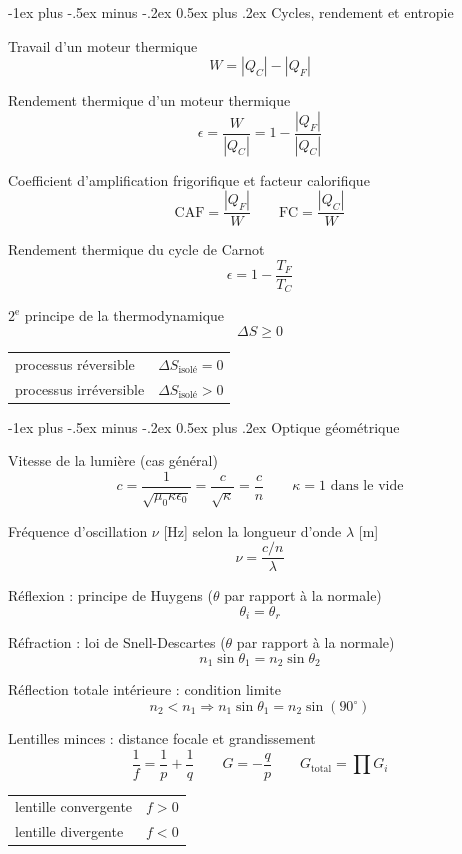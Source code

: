 \documentclass[10pt,landscape]{article}
\makeatletter
\renewcommand{\section}{\@startsection{section}{1}{0mm}%
                                {-1ex plus -.5ex minus -.2ex}%
                                {0.5ex plus .2ex}%
                                {\normalfont\large\bfseries}}
\newcommand{\halfline}{\vspace{0.5em}}
\newcommand{\tableindent}{\hspace{1.5em}}
\makeatother
\begin{document}
\begin{multicols}{3}
\hrulefill

\section{Cycles, rendement et entropie}

Travail d'un moteur thermique
\[ W = |Q_C| - |Q_F| \]

Rendement thermique d'un moteur thermique
\[ \epsilon=\frac{W}{|Q_C|} = 1 - \frac{|Q_F|}{|Q_C|} \]

Coefficient d'amplification frigorifique et facteur calorifique
\[ \text{CAF} = \frac{|Q_F|}{W} \qquad
\text{FC} = \frac{|Q_C|}{W} \]

Rendement thermique du cycle de Carnot
\[ \epsilon= 1- \frac{T_F}{T_C} \]

$2^\text{e}$ principe de la thermodynamique
\[ \Delta S \geq 0 \]

\begin{tabular}{@{\tableindent}ll}
	processus réversible & $\Delta S_\text{isolé} = 0$ \\
	processus irréversible & $\Delta S_\text{isolé} > 0$ \\
\end{tabular}
\halfline

\hrulefill


\section{Optique géométrique}

Vitesse de la lumière (cas général)
\[ c = \frac{1}{\sqrt{\mu_0 \kappa \epsilon_0}} = \frac{c}{\sqrt{\kappa}} = \frac{c}{n}  
\qquad
\kappa=1 \text{ dans le vide}
\]

Fréquence d'oscillation $\nu$ [Hz] selon la longueur d'onde $\lambda$ [m]
\[ \nu = \frac{c/n}{\lambda}\]

Réflexion : principe de Huygens {($\theta$ par rapport à la normale)}
\[ \theta_i = \theta_r\]

Réfraction : loi de Snell-Descartes {($\theta$ par rapport à la normale)}
\[ n_1\sin\theta_1 = n_2 \sin\theta_2
\]

Réflection totale intérieure : condition limite
\[ n_2 < n_1 \Rightarrow n_1 \sin\theta_1 = n_2 \sin(90^\circ)
\]


Lentilles minces : distance focale et grandissement
\[ \frac{1}{ f} = \frac{1}{p} + \frac{1}{q}
\qquad G = -\frac{q}{p} 
\qquad G_\text{total} = \prod G_i
\]

\begin{tabular}{@{\tableindent}ll}
	lentille convergente & $f>0$ \\
	lentille divergente & $f<0$ \\
\end{tabular}
\halfline



\end{multicols}
\end{document}
